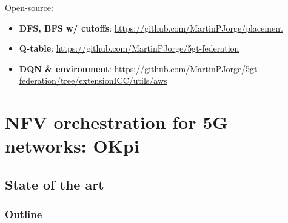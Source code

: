 \documentclass[aspectratio=169]{beamer}
\begin{document}
\begin{frame}
    \frametitle{\secname}
    \framesubtitle{\subsecname}
    Open-source:
    \begin{itemize}
        \item \textbf{DFS, BFS w/ cutoffs}: \url{https://github.com/MartinPJorge/placement}
        \item \textbf{Q-table}: \url{https://github.com/MartinPJorge/5gt-federation}
        \item \textbf{DQN \& environment}: \url{https://github.com/MartinPJorge/5gt-federation/tree/extensionICC/utils/aws}
    \end{itemize}
\end{frame}







\section{NFV orchestration for 5G networks: OKpi}
\subsection{State of the art}
\begin{frame}
    \frametitle{Outline}
    \tableofcontents[subsectionstyle=show/shaded/hide,sectionstyle=show/shaded]
\end{frame}
\end{document}
